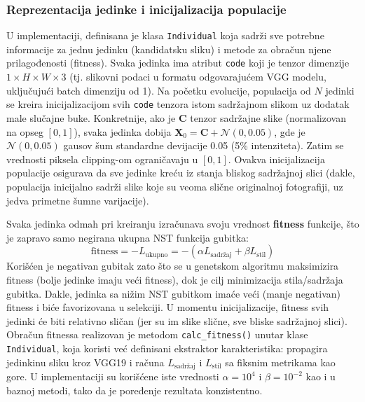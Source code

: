 \documentclass[a4paper,12pt]{article}
\begin{document}
\subsubsection{Reprezentacija jedinke i inicijalizacija populacije}
U implementaciji, definisana je klasa \texttt{Individual} koja sadrži sve potrebne informacije za jednu jedinku (kandidatsku sliku) i metode za obračun njene prilagođenosti (fitness). Svaka jedinka ima atribut \texttt{code} koji je tenzor dimenzije $1\times H \times W \times 3$ (tj. slikovni podaci u formatu odgovarajućem VGG modelu, uključujući batch dimenziju od 1). Na početku evolucije, populacija od $N$ jedinki se kreira inicijalizacijom svih \texttt{code} tenzora istom sadržajnom slikom uz dodatak male slučajne buke. Konkretnije, ako je $\mathbf{C}$ tenzor sadržajne slike (normalizovan na opseg $[0,1]$), svaka jedinka dobija $\mathbf{X}_0 = \mathbf{C} + \mathcal{N}(0, 0.05)$, gde je $\mathcal{N}(0,0.05)$ gausov šum standardne devijacije 0.05 (5\% intenziteta). Zatim se vrednosti piksela clipping-om ograničavaju u $[0,1]$. Ovakva inicijalizacija populacije osigurava da sve jedinke kreću iz stanja bliskog sadržajnoj slici (dakle, populacija inicijalno sadrži slike koje su veoma slične originalnoj fotografiji, uz jedva primetne šumne varijacije). 

Svaka jedinka odmah pri kreiranju izračunava svoju vrednost \textbf{fitness} funkcije, što je zapravo samo negirana ukupna NST funkcija gubitka:
\[
\text{fitness} = -L_{\text{ukupno}} = -(\alpha L_{\text{sadržaj}} + \beta L_{\text{stil}})
\]
Korišćen je negativan gubitak zato što se u genetskom algoritmu maksimizira fitness (bolje jedinke imaju veći fitness), dok je cilj minimizacija stila/sadržaja gubitka. Dakle, jedinka sa nižim NST gubitkom imaće veći (manje negativan) fitness i biće favorizovana u selekciji. U momentu inicijalizacije, fitness svih jedinki će biti relativno sličan (jer su im slike slične, sve bliske sadržajnoj slici). Obračun fitnessa realizovan je metodom \texttt{calc\_fitness()} unutar klase \texttt{Individual}, koja koristi već definisani ekstraktor karakteristika: propagira jedinkinu sliku kroz VGG19 i računa $L_{\text{sadržaj}}$ i $L_{\text{stil}}$ sa fiksnim metrikama kao gore. U implementaciji su korišćene iste vrednosti $\alpha=10^4$ i $\beta=10^{-2}$ kao i u baznoj metodi, tako da je poređenje rezultata konzistentno.
\end{document}
